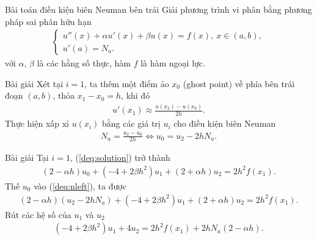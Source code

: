 \documentclass[9pt]{beamer}
\numberwithin{equation}{section}
\begin{document}
\begin{frame}
\begin{block}{Bài toán điều kiện biên Neuman bên trái}
    Giải phương trình vi phân bằng phương pháp sai phân hữu hạn
    \begin{align*}
        \begin{cases}
        u''(x) + \alpha u'(x) + \beta u(x) = f(x), \ x \in (a,b), \\
        u'(a) = N_a.
        \end{cases}
    \end{align*}
    với $\alpha$, $\beta$ là các hằng số thực, hàm $f$ là hàm ngoại lực.
\end{block}

\begin{exampleblock}{Bài giải}
    Xét tại $i = 1$, ta thêm một điểm ảo $x_0$ (ghost point) về phía bên trái đoạn $(a,b)$, thỏa $x_1 - x_0 = h$, khi đó
    \begin{align*}
        u'(x_1) \approx \frac{u(x_2) - u(x_0)}{2h}.
    \end{align*}
    Thực hiện xấp xỉ $u(x_i)$ bằng các giá trị $u_i$ cho điều kiện biên Neuman
    \begin{align*}
        N_a = \frac{u_2 - u_0}{2h} \Leftrightarrow u_0 = u_2 - 2h N_a.
    \end{align*}
\end{exampleblock}
\end{frame}

\begin{frame}
\begin{exampleblock}{Bài giải}
    Tại $i = 1$, (\ref{deq:solution}) trở thành
    \begin{align}
        (2 - \alpha h) u_0 + (-4 + 2\beta h^2) u_1 + (2 + \alpha h) u_2 = 2h^2 f(x_1). \label{deq:nleft}
    \end{align}
    Thế $u_0$ vào (\ref{deq:nleft}), ta được
    \begin{align*}
        (2 - \alpha h) (u_2 - 2h N_a) + (-4 + 2\beta h^2) u_1 + (2 + \alpha h) u_2 = 2h^2 f(x_1).
    \end{align*}
    Rút các hệ số của $u_1$ và $u_2$
    \begin{align}
        (-4 + 2\beta h^2) u_1 + 4 u_2 = 2h^2 f(x_1) + 2hN_a(2 - \alpha h). \label{deq:nl_solution}
    \end{align}
\end{exampleblock}
\end{frame}
\end{document}
